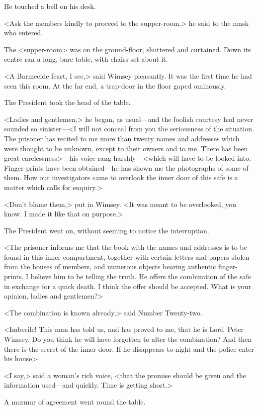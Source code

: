 He touched a bell on his desk.

<Ask the members kindly to proceed to the supper-room,> he said to the mask who entered.

The <supper-room> was on the ground-floor, shuttered and curtained. Down its centre ran a long, bare table, with chairs set about it.

<A Barmecide feast, I see,> said Wimsey pleasantly. It was the first time he had seen this room. At the far end, a trap-door in the floor gaped ominously.

The President took the head of the table.

<Ladies and gentlemen,> he began, as usual—and the foolish courtesy had never sounded so sinister—<I will not conceal from you the seriousness of the situation. The prisoner has recited to me more than twenty names and addresses which were thought to be unknown, except to their owners and to me. There has been great carelessness>—his voice rang harshly—<which will have to be looked into. Finger-prints have been obtained—he has shown me the photographs of some of them. How our investigators came to overlook the inner door of this safe is a matter which calls for enquiry.>

<Don't blame them,> put in Wimsey. <It was meant to be overlooked, you know. I made it like that on purpose.>

The President went on, without seeming to notice the interruption.

<The prisoner informs me that the book with the names and addresses is to be found in this inner compartment, together with certain letters and papers stolen from the houses of members, and numerous objects bearing authentic finger-prints. I believe him to be telling the truth. He offers the combination of the safe in exchange for a quick death. I think the offer should be accepted. What is your opinion, ladies and gentlemen?>

<The combination is known already,> said Number Twenty-two.

<Imbecile! This man has told us, and has proved to me, that he is Lord~Peter Wimsey. Do you think he will have forgotten to alter the combination? And then there is the secret of the inner door. If he disappears to-night and the police enter his house\longdash>

<I say,> said a woman's rich voice, <that the promise should be given and the information used—and quickly. Time is getting short.>

A murmur of agreement went round the table.

